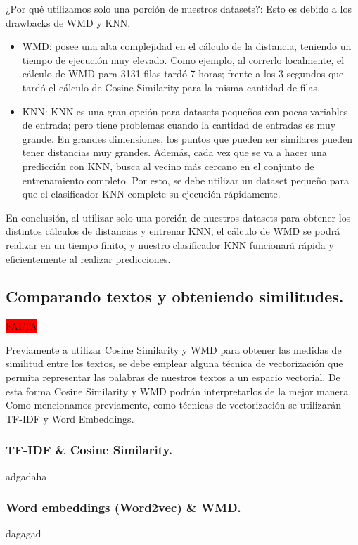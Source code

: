 \documentclass[12pt,a4paper]{article}
\begin{document}
\begin{sloppypar}
¿Por qué utilizamos solo una porción de nuestros datasets?: Esto es debido a los drawbacks de WMD y KNN.
\begin{itemize}
\item WMD: posee una alta complejidad en el cálculo de la distancia, teniendo un tiempo de ejecución muy elevado. Como ejemplo, al correrlo localmente, el cálculo de WMD para 3131 filas tardó 7 horas; frente a los 3 segundos que tardó el cálculo de Cosine Similarity para la misma cantidad de filas.
\item KNN: KNN es una gran opción para datasets pequeños con pocas variables de entrada; pero tiene problemas cuando la cantidad de entradas es muy grande. En grandes dimensiones, los puntos que pueden ser similares pueden tener distancias muy grandes. Además, cada vez que se va a hacer una predicción con KNN, busca al vecino más cercano en el conjunto de entrenamiento completo. Por esto, se debe utilizar un dataset pequeño para que el clasificador KNN complete su ejecución rápidamente.
\end{itemize}
En conclusión, al utilizar solo una porción de nuestros datasets para obtener los distintos cálculos de distancias y entrenar KNN, el cálculo de WMD se podrá realizar en un tiempo finito, y nuestro clasificador KNN funcionará rápida y eficientemente al realizar predicciones.

\cleardoublepage

\subsection{Comparando textos y obteniendo similitudes.}
\colorbox{red}{FALTA}

Previamente a utilizar Cosine Similarity y WMD para obtener las medidas de similitud entre los textos, se debe emplear alguna técnica de vectorización que permita representar las palabras de nuestros textos a un espacio vectorial. De esta forma Cosine Similarity y WMD podrán interpretarlos de la mejor manera.  Como mencionamos previamente, como técnicas de vectorización se utilizarán TF-IDF y Word Embeddings. 

\cleardoublepage

\subsubsection{TF-IDF \& Cosine Similarity.}
adgadaha
\cleardoublepage

\subsubsection{Word embeddings (Word2vec) \& WMD.}\label{Implementacion_word_emb_y_wmd}
dagagad
\cleardoublepage


\end{sloppypar}
\end{document}
